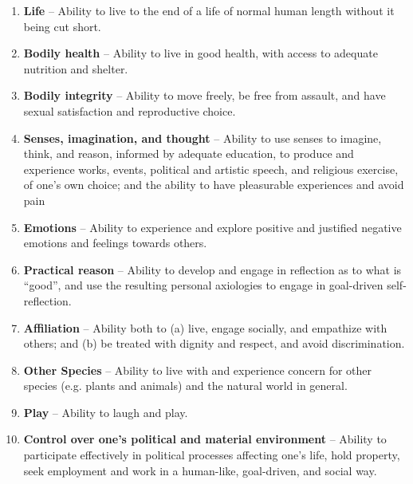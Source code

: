 \documentclass[letterpaper]{article} %
\begin{document}
\begin{enumerate}
    \item \textbf{Life} -- Ability to live to the end of a life of normal human length without it being cut short.
    \item \textbf{Bodily health} -- Ability to live in good health, with access to adequate nutrition and shelter.
    \item \textbf{Bodily integrity} -- Ability to move freely, be free from assault, and have sexual satisfaction and reproductive choice.
    \item \textbf{Senses, imagination, and thought} -- Ability to use senses to imagine, think, and reason,
    informed by adequate education,
    to produce and experience works, events, political and artistic speech, and religious exercise, of one's own choice; and the ability to have pleasurable experiences and avoid pain
    \item \textbf{Emotions} -- Ability to experience and explore positive and justified negative emotions and feelings towards others. %
    \item \textbf{Practical reason} -- Ability to develop and engage in reflection as to what is ``good'', and use the resulting personal axiologies to engage in goal-driven self-reflection.
    \item \textbf{Affiliation} -- Ability both to (a) live, engage socially, and empathize with others; and (b) be treated with dignity and respect, and avoid discrimination.
    \item \textbf{Other Species} -- Ability to live with and experience concern for other species (e.g. plants and animals) and the natural world in general.
    \item \textbf{Play} -- Ability to laugh and play.
    \item \textbf{Control over one's political and material environment} --
    Ability to participate effectively in political processes affecting one's life, hold property, seek employment and work in a human-like, goal-driven, and social way.
\end{enumerate}
\end{document}
